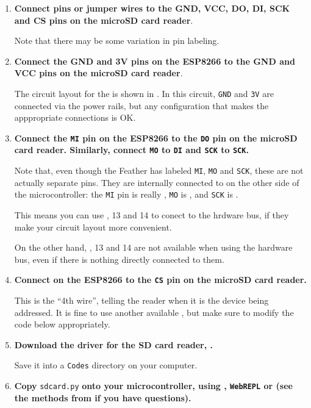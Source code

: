 \begin{enumerate}
	\item \textbf{Connect pins or jumper wires to the GND, VCC, DO, DI, SCK and CS pins on the microSD card reader}.

	Note that there may be some variation in pin labeling.

	\item \textbf{Connect the GND and 3V pins on the ESP8266 to the GND and VCC pins on the microSD card reader}.

	The circuit layout for the  is shown in .
	In this circuit, \texttt{GND} and \texttt{3V} are connected via the power rails, but any configuration that makes the apppropriate connections is OK.

	\item \textbf{Connect the \texttt{MI} pin on the ESP8266 to the \texttt{DO} pin on the microSD card reader. Similarly, connect \texttt{MO} to \texttt{DI} and \texttt{SCK} to \texttt{SCK}.}

	Note that, even though the  Feather has \gpios labeled \texttt{MI}, \texttt{MO} and \texttt{SCK}, these are not actually separate pins.
	They are internally connected to \gpios on the other side of the microcontroller: the \texttt{MI} pin is really , \texttt{MO} is , and \texttt{SCK} is .

	\smallskip
	This means you can use , 13 and 14 to conect to the hrdware \spi bus, if they make your circuit layout more convenient.

	\smallskip
	On the other hand, , 13 and 14 are not available when using the hardware \spi bus, even if there is nothing directly connected to them.

	\item \textbf{Connect  on the ESP8266 to the \texttt{CS} pin on the microSD card reader.}

	This is the ``4th wire'', telling the reader when it is the device being addressed.
	It is fine to use another available \gpio, but make sure to modify the code below appropriately.

	\item \textbf{Download the driver for the SD card reader, .}

	Save it into a \texttt{Codes} directory on your computer.

	\item \textbf{Copy } \lstinline{sdcard.py} \textbf{onto your microcontroller, using \thonny, \texttt{WebREPL} or \mpfshell (see the methods from  if you have questions).}


\end{enumerate}
